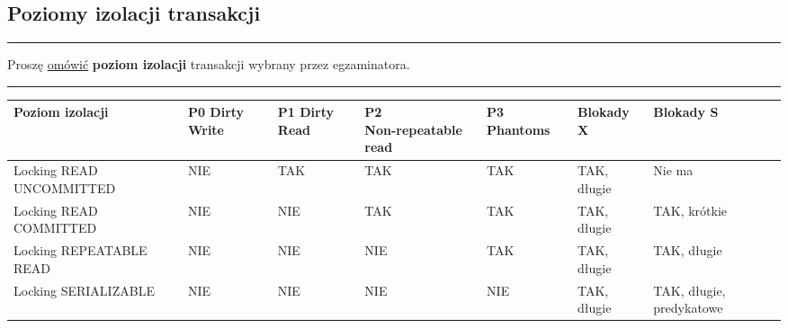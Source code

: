 \documentclass[a5paper,6pt]{article}
\newcommand{\horrule}[1]{\rule{\linewidth}{#1}}
\begin{document}

    \subsection{Poziomy izolacji transakcji} %
    \label{sub:poziomy_izolacji_transakcji}

    \horrule{0.5pt}
    Proszę \underline{omówić} \textbf{poziom izolacji} transakcji wybrany przez
    egzaminatora.\\
    \horrule{0.5pt}

    \vskip 1cm

\begin{adjustbox}{width=\columnwidth,center}
    \begin{tabular}{|p{3cm}|p{1cm}|p{1cm}|p{2cm}|p{1cm}|p{1.3cm}|p{1.3cm}|}
      \hline
      \textbf{Poziom izolacji} &
      \textbf{P0 Dirty Write} &
      \textbf{P1 Dirty Read} &
      \textbf{P2 \newline Non-repeatable read} &
      \textbf{P3 Phantoms} &
      \textbf{Blokady X} &
      \textbf{Blokady S}\\
      \hline
      Locking READ \newline UNCOMMITTED &
      \cellcolor{red!25} NIE   &
      \cellcolor{green!25} TAK &
      \cellcolor{green!25} TAK &
      \cellcolor{green!25} TAK &
      \cellcolor{yellow!25} TAK, długie &
      Nie ma\\
      \hline
      Locking READ \newline COMMITTED &
      \cellcolor{red!25} NIE   &
      \cellcolor{red!25} NIE   &
      \cellcolor{green!25} TAK &
      \cellcolor{green!25} TAK &
      \cellcolor{yellow!25} TAK, długie &
      \cellcolor{cyan!15} TAK, krótkie\\
      \hline
      Locking REPEATABLE READ  &
      \cellcolor{red!25} NIE   &
      \cellcolor{red!25} NIE   &
      \cellcolor{red!25} NIE   &
      \cellcolor{green!25} TAK &
      \cellcolor{yellow!25} TAK, długie &
      \cellcolor{yellow!25} TAK, długie\\
      \hline
      Locking \newline SERIALIZABLE &
      \cellcolor{red!25} NIE &
      \cellcolor{red!25} NIE &
      \cellcolor{red!25} NIE &
      \cellcolor{red!25} NIE &
      \cellcolor{yellow!25} TAK, długie &
      \cellcolor{blue!25} TAK, długie, predykatowe\\
      \hline

    \end{tabular}
\end{adjustbox}
    \vskip 1cm
\end{document}

